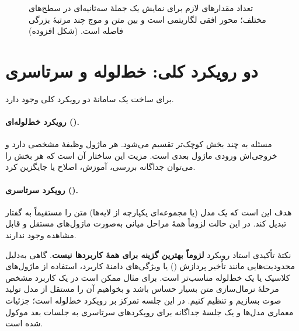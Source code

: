 \begin{figure}[htbp]
\centering
{}
\caption{تعداد مقدارهای لازم برای نمایش یک جملهٔ سه‌ثانیه‌ای در سطح‌های مختلف؛ محور افقی لگاریتمی است و بین متن و موج چند مرتبهٔ بزرگی فاصله است. (شکل افزوده)}
\end{figure}

\section{دو رویکرد کلی: خط‌لوله و سرتاسری}

برای ساخت یک سامانهٔ  دو رویکرد کلی وجود دارد.

\paragraph{رویکرد خط‌لوله‌ای ().}
مسئله به چند بخش کوچک‌تر تقسیم می‌شود. هر ماژول وظیفهٔ مشخصی دارد و خروجی‌اش ورودی ماژول بعدی است. مزیت این ساختار آن است که هر بخش را می‌توان جداگانه بررسی، آموزش، اصلاح یا جایگزین کرد.

\paragraph{رویکرد سرتاسری ().}
هدف این است که یک مدل (یا مجموعه‌ای یکپارچه از لایه‌ها) متن را مستقیماً به گفتار تبدیل کند. در این حالت لزوماً همهٔ مراحل میانی به‌صورت ماژول‌های مستقل و قابل مشاهده وجود ندارند.

\begin{exambox}{نکتهٔ تأکیدی استاد}
رویکرد  \textbf{لزوماً بهترین گزینه برای همهٔ کاربردها نیست}. گاهی به‌دلیل محدودیت‌هایی مانند تأخیر پردازش () یا ویژگی‌های دامنهٔ کاربرد، استفاده از ماژول‌های کلاسیک یا یک خط‌لوله مناسب‌تر است. برای مثال ممکن است در یک کاربرد مشخص مرحلهٔ نرمال‌سازی متن بسیار حساس باشد و بخواهیم آن را مستقل از مدل تولید صوت بسازیم و تنظیم کنیم. در این جلسه تمرکز بر رویکرد خط‌لوله است؛ جزئیات معماری مدل‌ها و یک جلسهٔ جداگانه برای رویکردهای سرتاسری به جلسات بعد موکول شده است.
\end{exambox}

